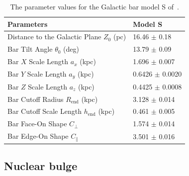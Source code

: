 \documentclass[doublespace,nopageskip]{VTthesis} %
\begin{document}

\begin{table}[htb]
\centering
\caption{ The parameter values for the Galactic bar model S of~\citet{1998ApJ...492..495F}.}
    \begin{tabular}{ll}
    \toprule
      Parameters & Model S \\ 
      \midrule
      Distance to the Galactic Plane $Z_0$ (pc) & 16.46 $\pm$ 0.18\\
      Bar Tilt Angle $\theta_0$ (deg) & 13.79 $\pm$ 0.09\\
      Bar $X$ Scale Length $a_x$ (kpc) & 1.696 $\pm$ 0.007 \\
      Bar $Y$ Scale Length $a_y$ (kpc) & 0.6426 $\pm$ 0.0020 \\
      Bar $Z$ Scale Length $a_z$ (kpc) & 0.4425 $\pm$ 0.0008 \\
      Bar Cutoff Radius $R_{\text{end}}$ (kpc) & 3.128 $\pm$ 0.014 \\
      Bar Cutoff Scale Length $h_{\text{end}}$ (kpc) & 0.461 $\pm$ 0.005 \\
      Bar Face-On Shape $C_\perp$ & 1.574 $\pm$ 0.014 \\
      Bar Edge-On Shape $C_\parallel$ & 3.501 $\pm$ 0.016\\
      \bottomrule
    \end{tabular}
\label{tab:modelS}
\end{table}

\subsection{Nuclear bulge}\label{sec:nb}
\end{document}
